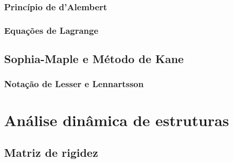 \subsubsection{Princípio de d'Alembert}



\subsubsection{Equações de Lagrange}


\subsection{Sophia-Maple e Método de Kane}\label{sec::sophia-kane}

\subsubsection{Notação de Lesser e Lennartsson}


\section{Análise dinâmica de estruturas}

\subsection{Matriz de rigidez} \label{sec::rigidez}


